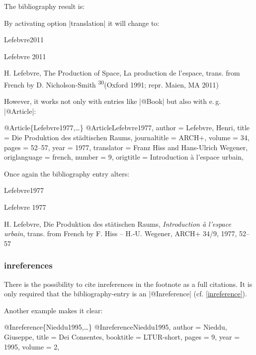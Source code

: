 \documentclass[a4paper,
10pt,
greek,
french,
spanish,
italian,
ngerman,
english
]{ltxdoc}
\begin{document}
The bibliography result is:

By activating option |translation| it will change to:

\begin{bibbox}{Lefebvre2011}\footnotesize
\parbox[t]{2cm}{Lefebvre 2011} \parbox[t]{9cm}{H. Lefebvre,  The Production of Space, 
{\color{red} La production de l’espace, trans. from French by D. Nicholson-Smith} \textsuperscript{30}(Oxford 1991; repr. Maien, MA 2011)}
\end{bibbox}
 
However, it works not only with entries like |@Book| but also with e.\,g. |@Article|:

\begin{bibexample}[label=Lefebvre1977]{{@}Article\{Lefebvre1977,…\}}
@Article{Lefebvre1977,
  author       = {Lefebvre, Henri},
  title        = {Die Produktion des städtischen Raums},
  journaltitle = {ARCH+},
  volume       = {34},
  pages        = {52--57},
  year         = {1977},
  translator   = {Franz Hiss and Hans-Ulrich Wegener},
  origlanguage = {french},
  number       = {9},
  origtitle    = {Introduction à l'espace urbain},
}
\end{bibexample}

Once again the bibliography entry alters:

\begin{bibbox}{Lefebvre1977}\footnotesize
\parbox[t]{2cm}{Lefebvre 1977} \parbox[t]{9cm}{H. Lefebvre, 
Die Produktion des stätischen Raums, \emph{Introduction à l’espace urbain}, 
{\color{red} trans. from French by F. Hiss -- H.-U. Wegener}, ARCH+ 34/9, 1977, 52–57}
\end{bibbox}

\subsubsection{inreferences}\label{inreferences}
There is the possibility to cite inreferences in the footnote as a full citations.
It is only required that the bibliography-entry is an |@Inreference|  (cf. \cref{inreference}).
 
Another example makes it clear: 
\begin{bibexample}[label=Nieddu1995]{{@}Inreference\{Nieddu1995,…\}}
@Inreference{Nieddu1995,
  author    = {Nieddu, Giuseppe},
  title     = {Dei Consentes},
  booktitle = LTUR-short,
  pages     = {9\psq},
  year      = {1995},
  volume    = {2},
}
\end{bibexample}
\end{document}
